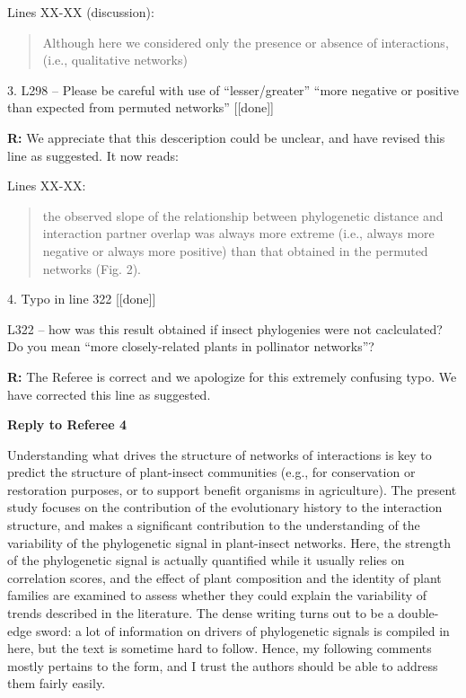 \documentclass[12pt]{letter}
\newenvironment{refquote}{\bigskip \begin{it}}{\end{it}\smallskip}
\begin{document}
    	Lines XX-XX (discussion):

    	\begin{quotation}

		  Although here we considered only the presence or absence of interactions,
		  (i.e., qualitative networks)

    	\end{quotation}


	3. L298 – Please be careful with use of “lesser/greater” “more negative or positive than expected from permuted networks” [[done]]

		\textbf{R:} We appreciate that this desceription could be unclear, and have revised this line as suggested. It now reads:

		Lines XX-XX:

		\begin{quotation}

			the observed 
		    slope of the relationship between phylogenetic distance and interaction 
		    partner overlap was always more extreme (i.e., always more negative or 
		    always more positive) than that obtained in the permuted networks (Fig. 2).

	    \end{quotation}


	4. Typo in line 322 [[done]]
		
		\begin{refquote}
			L322 – how was this result obtained if insect phylogenies were not caclculated? Do you mean “more closely-related plants in pollinator networks”?
		\end{refquote}


		\textbf{R:} The Referee is correct and we apologize for this extremely confusing typo. We have corrected this line as suggested.


\clearpage


{\Large \bf Reply to Referee 4}

	\begin{refquote}
		Understanding what drives the structure of networks of interactions is key to predict the structure of plant-insect communities (e.g., for conservation or restoration purposes, or to support benefit organisms in agriculture).
		The present study focuses on the contribution of the evolutionary history to the interaction structure, and makes a significant contribution to the understanding of the variability of the phylogenetic signal in plant-insect networks. Here, the strength of the phylogenetic signal is actually quantified while it usually relies on correlation scores, and the effect of plant composition and the identity of plant families are examined to assess whether they could explain the variability of trends described in the literature.
		The dense writing turns out to be a double-edge sword: a lot of information on drivers of phylogenetic signals is compiled in here, but the text is sometime hard to follow. Hence, my following comments mostly pertains to the form, and I trust the authors should be able to address them fairly easily.
	\end{refquote}
\end{document}
